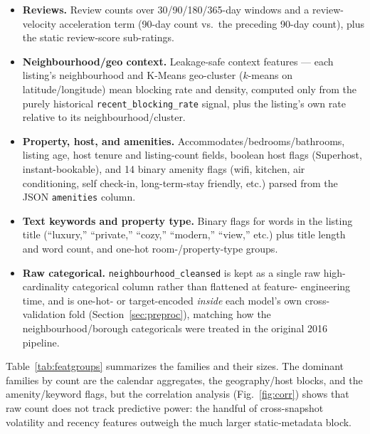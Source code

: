 \documentclass[journal]{IEEEtran}
\begin{document}
\begin{itemize}
missing in this export, all price signal here is reconstructed from the daily
calendar price field.
\item \textbf{Reviews.} Review counts over 30/90/180/365-day windows and a
review-velocity acceleration term (90-day count vs.\ the preceding 90-day
count), plus the static review-score sub-ratings.
\item \textbf{Neighbourhood/geo context.} Leakage-safe context features ---
each listing's neighbourhood and K-Means geo-cluster ($k$-means on
latitude/longitude) mean blocking rate and density, computed only from the
purely historical \texttt{recent\_blocking\_rate} signal, plus the listing's own
rate relative to its neighbourhood/cluster.
\item \textbf{Property, host, and amenities.} Accommodates/bedrooms/bathrooms,
listing age, host tenure and listing-count fields, boolean host flags
(Superhost, instant-bookable), and 14 binary amenity flags (wifi, kitchen, air
conditioning, self check-in, long-term-stay friendly, etc.) parsed from the
JSON \texttt{amenities} column.
\item \textbf{Text keywords and property type.} Binary flags for words in the
listing title (``luxury,'' ``private,'' ``cozy,'' ``modern,'' ``view,'' etc.)
plus title length and word count, and one-hot room-/property-type groups.
\item \textbf{Raw categorical.} \texttt{neighbourhood\_cleansed} is kept as a
single raw high-cardinality categorical column rather than flattened at feature-
engineering time, and is one-hot- or target-encoded \emph{inside} each model's
own cross-validation fold (Section~\ref{sec:preproc}), matching how the
neighbourhood/borough categoricals were treated in the original 2016 pipeline.
\end{itemize}

Table~\ref{tab:featgroups} summarizes the families and their sizes. The
dominant families by count are the calendar aggregates, the geography/host
blocks, and the amenity/keyword flags, but the correlation analysis
(Fig.~\ref{fig:corr}) shows that raw count does not track predictive power: the
handful of cross-snapshot volatility and recency features outweigh the much
larger static-metadata block.
\end{document}
